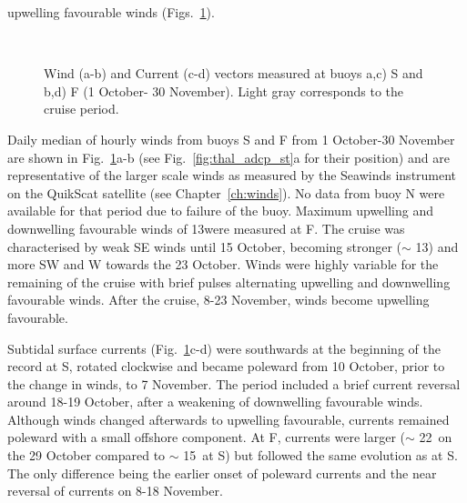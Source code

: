 upwelling favourable winds (Figs.~\ref{fig:thal_buoydata}).
\begin{figure}
\arribacap \centering {}  \\
\caption{Wind (a-b) and Current (c-d) vectors measured at buoys
a,c) S and b,d) F (1 October- 30 November). Light gray corresponds
to the cruise period.} \label{fig:thal_buoydata}
\end{figure}


Daily median of hourly winds from buoys S and F from 1 October-30
November are shown in Fig.~\ref{fig:thal_buoydata}a-b (see
Fig.~\ref{fig:thal_adcp_st}a for their position) and are
representative of the larger scale winds as measured by the
Seawinds instrument on the QuikScat satellite (see
Chapter~\ref{ch:winds}). No data from buoy N were available for
that period due to failure of the buoy. Maximum upwelling and
downwelling favourable winds of 13\vel were measured at F. The
cruise was characterised by weak SE winds until 15 October,
becoming stronger ($\sim$ 13\vel) and more SW and W towards the 23
October. Winds were highly variable for the remaining of the
cruise with brief pulses alternating upwelling and downwelling
favourable winds. After the cruise, 8-23 November, winds become
upwelling favourable.

Subtidal surface currents (Fig.~\ref{fig:thal_buoydata}c-d) were
southwards at the beginning of the record at S, rotated clockwise
and became poleward from 10 October, prior to the change in winds,
to 7 November. The period included a brief current reversal around
18-19 October, after a weakening of downwelling favourable winds.
Although winds changed afterwards to upwelling favourable,
currents remained poleward with a small offshore component. At F,
currents were larger ($\sim$ 22\velc\, on the 29 October compared
to $\sim$ 15\velc\, at S) but followed the same evolution as at S.
The only difference being the earlier onset of poleward currents
and the near reversal of currents on 8-18 November.

